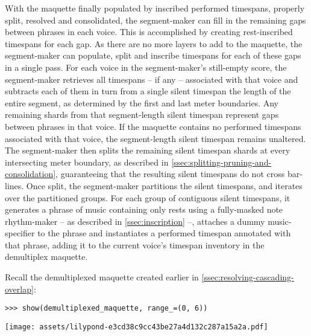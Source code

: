 With the maquette finally populated by inscribed performed timespans, properly
split, resolved and consolidated, the segment-maker can fill in the remaining
gaps between phrases in each voice. This is accomplished by creating
rest-inscribed timespans for each gap. As there are no more layers to add to
the maquette, the segment-maker can populate, split and inscribe timespans for
each of these gaps in a single pass. For each voice in the segment-maker's
still-empty score, the segment-maker retrieves all timespans -- if any --
associated with that voice and subtracts each of them in turn from a single
silent timespan the length of the entire segment, as determined by the first
and last meter boundaries. Any remaining shards from that segment-length silent
timespan represent gaps between phrases in that voice. If the maquette contains
no performed timespans associated with that voice, the segment-length silent
timespan remains unaltered. The segment-maker then splits the remaining silent
timespan shards at every intersecting meter boundary, as described in
\autoref{ssec:splitting-pruning-and-consolidation}, guaranteeing that the
resulting silent timespans do not cross bar-lines. Once split, the
segment-maker partitions the silent timespans, and iterates over the
partitioned groups. For each group of contiguous silent timespans, it generates
a phrase of music containing only rests using a fully-masked note rhythm-maker
-- as described in \autoref{ssec:inscription} --, attaches a dummy
music-specifier to the phrase and instantiates a performed timespan annotated
with that phrase, adding it to the current voice's timespan inventory in the
demultiplex maquette.

Recall the demultiplexed maquette created earlier in
\autoref{ssec:resolving-cascading-overlap}:

\begin{comment}
<abjad>
show(demultiplexed_maquette, range_=(0, 6))
</abjad>
\end{comment}

\begin{abjadbookoutput}
\begin{singlespacing}
\vspace{-0.5\baselineskip}
\begin{lstlisting}
>>> show(demultiplexed_maquette, range_=(0, 6))
\end{lstlisting}
\noindent\texttt{[image: assets/lilypond-e3cd38c9cc43be27a4d132c287a15a2a.pdf]}
\end{singlespacing}
\end{abjadbookoutput}

